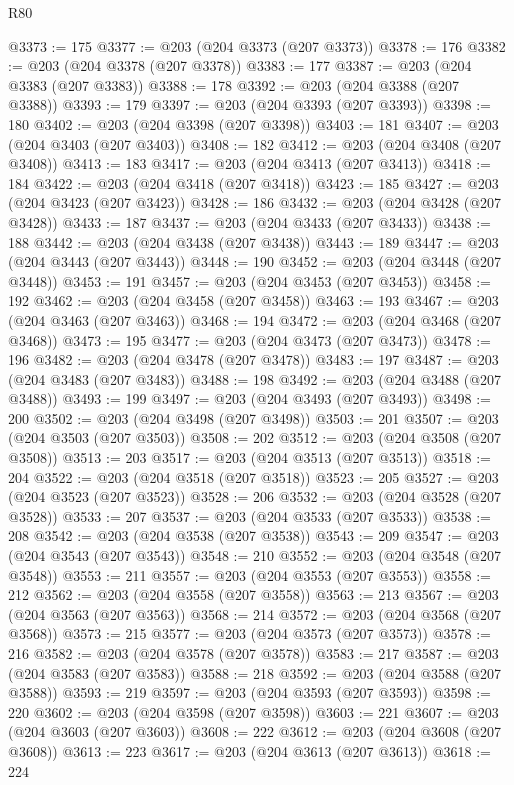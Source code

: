 \begin{lexlean}{R80}
\begin{coremodule}
@3373 := 175
@3377 := @203 (@204 @3373 (@207 @3373))
@3378 := 176
@3382 := @203 (@204 @3378 (@207 @3378))
@3383 := 177
@3387 := @203 (@204 @3383 (@207 @3383))
@3388 := 178
@3392 := @203 (@204 @3388 (@207 @3388))
@3393 := 179
@3397 := @203 (@204 @3393 (@207 @3393))
@3398 := 180
@3402 := @203 (@204 @3398 (@207 @3398))
@3403 := 181
@3407 := @203 (@204 @3403 (@207 @3403))
@3408 := 182
@3412 := @203 (@204 @3408 (@207 @3408))
@3413 := 183
@3417 := @203 (@204 @3413 (@207 @3413))
@3418 := 184
@3422 := @203 (@204 @3418 (@207 @3418))
@3423 := 185
@3427 := @203 (@204 @3423 (@207 @3423))
@3428 := 186
@3432 := @203 (@204 @3428 (@207 @3428))
@3433 := 187
@3437 := @203 (@204 @3433 (@207 @3433))
@3438 := 188
@3442 := @203 (@204 @3438 (@207 @3438))
@3443 := 189
@3447 := @203 (@204 @3443 (@207 @3443))
@3448 := 190
@3452 := @203 (@204 @3448 (@207 @3448))
@3453 := 191
@3457 := @203 (@204 @3453 (@207 @3453))
@3458 := 192
@3462 := @203 (@204 @3458 (@207 @3458))
@3463 := 193
@3467 := @203 (@204 @3463 (@207 @3463))
@3468 := 194
@3472 := @203 (@204 @3468 (@207 @3468))
@3473 := 195
@3477 := @203 (@204 @3473 (@207 @3473))
@3478 := 196
@3482 := @203 (@204 @3478 (@207 @3478))
@3483 := 197
@3487 := @203 (@204 @3483 (@207 @3483))
@3488 := 198
@3492 := @203 (@204 @3488 (@207 @3488))
@3493 := 199
@3497 := @203 (@204 @3493 (@207 @3493))
@3498 := 200
@3502 := @203 (@204 @3498 (@207 @3498))
@3503 := 201
@3507 := @203 (@204 @3503 (@207 @3503))
@3508 := 202
@3512 := @203 (@204 @3508 (@207 @3508))
@3513 := 203
@3517 := @203 (@204 @3513 (@207 @3513))
@3518 := 204
@3522 := @203 (@204 @3518 (@207 @3518))
@3523 := 205
@3527 := @203 (@204 @3523 (@207 @3523))
@3528 := 206
@3532 := @203 (@204 @3528 (@207 @3528))
@3533 := 207
@3537 := @203 (@204 @3533 (@207 @3533))
@3538 := 208
@3542 := @203 (@204 @3538 (@207 @3538))
@3543 := 209
@3547 := @203 (@204 @3543 (@207 @3543))
@3548 := 210
@3552 := @203 (@204 @3548 (@207 @3548))
@3553 := 211
@3557 := @203 (@204 @3553 (@207 @3553))
@3558 := 212
@3562 := @203 (@204 @3558 (@207 @3558))
@3563 := 213
@3567 := @203 (@204 @3563 (@207 @3563))
@3568 := 214
@3572 := @203 (@204 @3568 (@207 @3568))
@3573 := 215
@3577 := @203 (@204 @3573 (@207 @3573))
@3578 := 216
@3582 := @203 (@204 @3578 (@207 @3578))
@3583 := 217
@3587 := @203 (@204 @3583 (@207 @3583))
@3588 := 218
@3592 := @203 (@204 @3588 (@207 @3588))
@3593 := 219
@3597 := @203 (@204 @3593 (@207 @3593))
@3598 := 220
@3602 := @203 (@204 @3598 (@207 @3598))
@3603 := 221
@3607 := @203 (@204 @3603 (@207 @3603))
@3608 := 222
@3612 := @203 (@204 @3608 (@207 @3608))
@3613 := 223
@3617 := @203 (@204 @3613 (@207 @3613))
@3618 := 224

\end{coremodule}
\end{lexlean}
